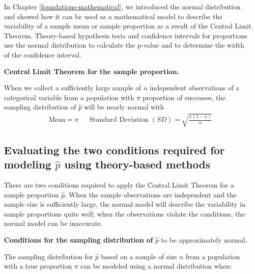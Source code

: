 \documentclass[
  10pt,
  openany]{book}
\theoremstyle{definition}
\theoremstyle{definition}
\theoremstyle{definition}
\theoremstyle{definition}
\theoremstyle{remark}
\begin{document}
In Chapter \ref{foundations-mathematical}, we introduced the normal distribution and showed how it can be used as a mathematical model to describe the variability of a sample mean or sample proportion as a result of the Central Limit Theorem. Theory-based hypothesis tests and confidence intervals for proportions use the normal distribution to calculate the p-value and to determine the width of the confidence interval.

\textbf{Central Limit Theorem for the sample proportion.}

When we collect a sufficiently large sample of \(n\) independent observations of a categorical variable from a population with \(\pi\) proportion of successes, the sampling distribution of \(\hat{p}\) will be nearly normal with \begin{align*}
  &\text{Mean}=\pi
  &&\text{Standard Deviation }(SD) = \sqrt{\frac{\pi(1-\pi)}{n}}
  \end{align*}

\subsection{\texorpdfstring{Evaluating the two conditions required for modeling \(\hat{p}\) using theory-based methods}{Evaluating the two conditions required for modeling \textbackslash hat\{p\} using theory-based methods}}\label{evaluating-the-two-conditions-required-for-modeling-hatp-using-theory-based-methods}

There are two conditions required to apply the Central Limit Theorem for a sample proportion \(\hat{p}\). When the sample observations are independent and the sample size is sufficiently large, the normal model will describe the variability in sample proportions quite well; when the observations violate the conditions, the normal model can be inaccurate.

\textbf{Conditions for the sampling distribution of} \(\hat{p}\) to be approximately normal.

The sampling distribution for \(\hat{p}\) based on a sample of size \(n\) from a population with a true proportion \(\pi\) can be modeled using a normal distribution when:
\end{document}

